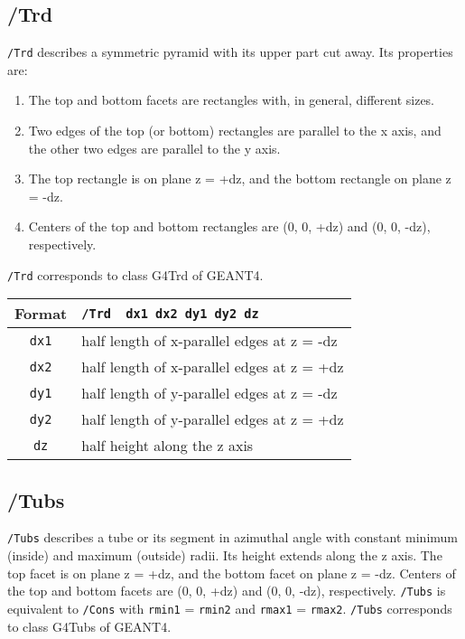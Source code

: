 \subsection{/Trd}
\verb+/Trd+ describes a symmetric pyramid with its upper part cut away.
Its properties are:

\begin{enumerate}
\item The top and bottom facets are rectangles with, in general, different sizes.
\item Two edges of the top (or bottom) rectangles   
      are parallel to the x axis, and   
      the other two edges are parallel to the y axis.
\item The     top    rectangle is  on plane  z = +dz,  
      and the bottom rectangle     on plane  z = -dz.
\item Centers of the top and bottom rectangles are   
      (0, 0, +dz) and  (0, 0, -dz), respectively.
\end{enumerate}
\verb+/Trd+ corresponds to class G4Trd of GEANT4.
\vspace{.20in}

\begin{tabular}{|c|l|}
\hline%
Format & \verb+/Trd  dx1 dx2 dy1 dy2 dz+\\
\hline%
\verb+dx1+    & half length of x-parallel edges at z = -dz\\
\hline%
\verb+dx2+    & half length of x-parallel edges at z = +dz\\
\hline%
\verb+dy1+    & half length of y-parallel edges at z = -dz\\
\hline%
\verb+dy2+    & half length of y-parallel edges at z = +dz\\
\hline%
\verb+dz+     & half height along the z axis \\
\hline%
\end{tabular}


\subsection{/Tubs}
\verb+/Tubs+ describes a tube or its segment in azimuthal angle  
with constant minimum (inside) and maximum (outside) radii.
Its height extends along the z axis.
The     top    facet is on plane z = +dz,   
and the bottom facet    on plane z = -dz.
Centers of the top and bottom facets are   
(0, 0, +dz) and  (0, 0, -dz), respectively.
\verb+/Tubs+ is equivalent to \verb+/Cons+    
with \verb+rmin1+ = \verb+rmin2+ and \verb+rmax1+ = \verb+rmax2+.
\verb+/Tubs+ corresponds to class G4Tubs of GEANT4.
\vspace{.20in}

